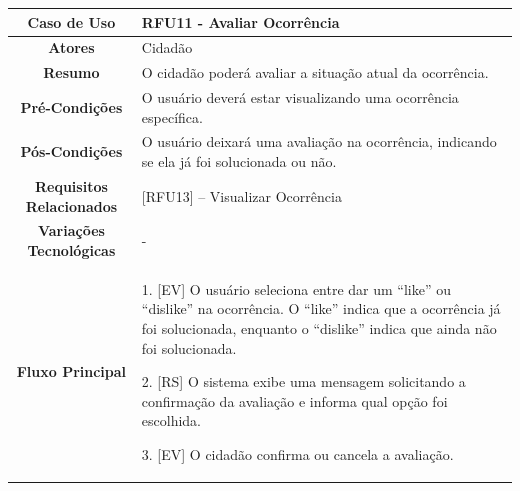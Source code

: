 \begin{apendicesenv}
\begin{quadro}[htb]
\end{quadro}

\begin{quadro}[htb]
	\centering
	\caption{\label{quadro_rfu11}Caso de Uso Avaliar Ocorrência (Baixo Nível)}
	\small
	\renewcommand{\arraystretch}{1.1}
	
	\begin{tabular}{|c|p{11cm}|}
		\hline
		\textbf{Caso de Uso} & RFU11 - Avaliar Ocorrência \\ \hline
		\textbf{Atores} & Cidadão \\ \hline
		\textbf{Resumo} & O cidadão poderá avaliar a situação atual da ocorrência. \\ \hline
		\textbf{Pré-Condições} & O usuário deverá estar visualizando uma ocorrência específica. \\ \hline
		\textbf{Pós-Condições} & O usuário deixará uma avaliação na ocorrência, indicando se ela já foi solucionada ou não. \\ \hline
		\textbf{Requisitos Relacionados} & [RFU13] -- Visualizar Ocorrência \\ \hline
		\textbf{Variações Tecnológicas} & - \\ \hline
		
		\textbf{Fluxo Principal} &
		\parbox[t]{11cm}{
			\raggedright
			1. [EV] O usuário seleciona entre dar um ``like'' ou ``dislike'' na ocorrência. O ``like'' indica que a ocorrência já foi solucionada, enquanto o ``dislike'' indica que ainda não foi solucionada.\par
			2. [RS] O sistema exibe uma mensagem solicitando a confirmação da avaliação e informa qual opção foi escolhida.\par
			3. [EV] O cidadão confirma ou cancela a avaliação.
		}
		\\ \hline
		
		\textbf{Tratamento de Exceções} &
		\parbox[t]{11cm}{
			\raggedright
			--
		}
		\\ \hline
	\end{tabular}
	
\end{quadro}

\begin{quadro}[htb]
	\centering
	\caption{\label{quadro_rfu12}Caso de Uso Visualizar Notificações (Baixo Nível)}
	\small
	\renewcommand{\arraystretch}{1.1}
	

\end{quadro}
\end{apendicesenv}

